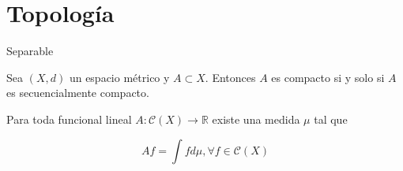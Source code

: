 \section{Topología}

\begin{definicion}
	Separable
\end{definicion}

\begin{teorema}\label{compacto-sec_compacto}
	Sea $(X,d)$ un espacio métrico y $A \subset X$. Entonces $A$ es compacto si y solo si $A$ es secuencialmente compacto.
\end{teorema}

\begin{teorema}\label{riesz}
	Para toda funcional lineal $A: \mathcal{C}(X) \rightarrow \mathbb{R}$ existe una medida $\mu$ tal que
	
	\begin{equation}
		Af = \int f d \mu, \forall f \in \mathcal{C}(X)
	\end{equation}
\end{teorema}